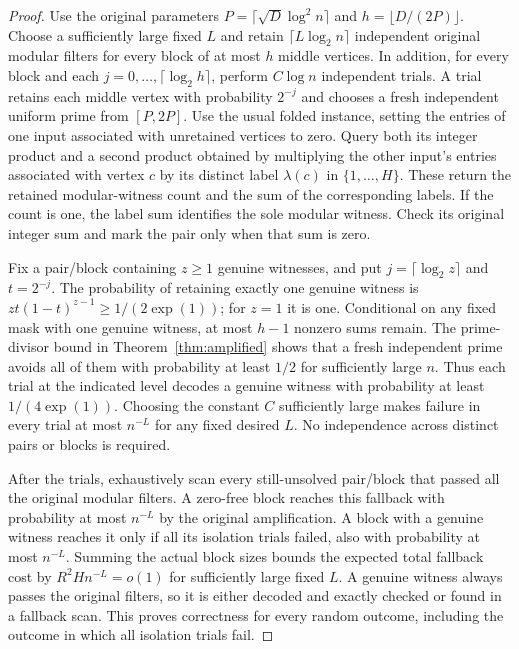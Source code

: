 \documentclass[11pt]{article}
\begin{document}
\begin{proof}
Use the original parameters $P=\lceil\sqrt D\log^2 n\rceil$ and
$h=\lfloor D/(2P)\rfloor$. Choose a sufficiently large fixed $L$ and
retain $\lceil L\log_2n\rceil$ independent original modular filters
for every block of at most $h$ middle vertices. In addition, for
every block and each $j=0,\ldots,\lceil\log_2h\rceil$, perform
$C\log n$ independent trials. A trial retains each middle vertex with
probability $2^{-j}$ and chooses a fresh independent uniform prime from
$[P,2P]$. Use the usual folded instance, setting the entries of one input
associated with unretained vertices to zero. Query both its integer
product and a second product obtained by multiplying the other input's
entries associated with vertex $c$ by its distinct label $\lambda(c)$ in
$\{1,\ldots,H\}$. These return the retained modular-witness count and the
sum of the corresponding labels. If the count is one, the label sum
identifies the sole modular witness. Check its original integer sum and
mark the pair only when that sum is zero.

Fix a pair/block containing $z\ge1$ genuine witnesses, and put
$j=\lceil\log_2 z\rceil$ and $t=2^{-j}$. The probability of retaining
exactly one genuine witness is $zt(1-t)^{z-1}\ge1/(2\exp(1))$; for $z=1$
it is one. Conditional on any fixed mask with one genuine witness, at most
$h-1$ nonzero sums remain. The prime-divisor bound in
Theorem~\ref{thm:amplified} shows that a fresh independent prime avoids
all of them with probability at least $1/2$ for sufficiently large $n$.
Thus each trial at the indicated level decodes a genuine witness with
probability at least $1/(4\exp(1))$. Choosing the constant $C$ sufficiently
large makes failure in every trial at most $n^{-L}$ for any fixed desired
$L$. No independence across distinct pairs or blocks is required.

After the trials, exhaustively scan every still-unsolved pair/block that
passed all the original modular filters. A zero-free block reaches this
fallback with probability at most $n^{-L}$ by the original amplification.
A block with a genuine witness reaches it only if all its isolation trials
failed, also with probability at most $n^{-L}$. Summing the actual block
sizes bounds the expected total fallback cost by $R^2Hn^{-L}=o(1)$ for
sufficiently large fixed $L$. A genuine witness always passes the original
filters, so it is either decoded and exactly checked or found in a fallback
scan. This proves correctness for every random outcome, including the
outcome in which all isolation trials fail.


\end{proof}
\end{document}
